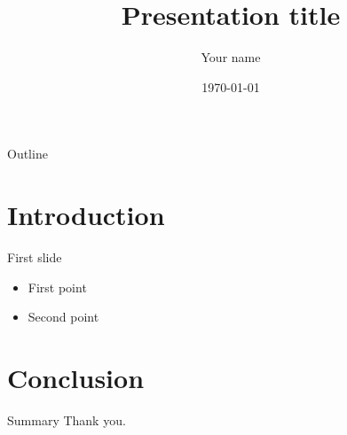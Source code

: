 \documentclass{beamer}
\title{Presentation title}
\author{Your name}
\date{\today}
\begin{document}
\begin{frame}
  \titlepage
\end{frame}

\begin{frame}{Outline}
  \tableofcontents
\end{frame}

\section{Introduction}

\begin{frame}{First slide}
  \begin{itemize}
    \item First point
    \item Second point
  \end{itemize}
\end{frame}

\section{Conclusion}

\begin{frame}{Summary}
  Thank you.
\end{frame}
\end{document}
